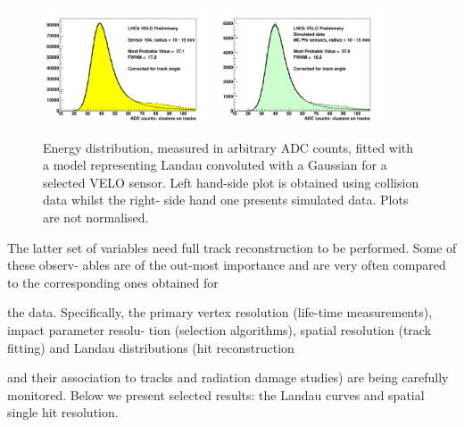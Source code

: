 \begin{figure}[]
    \centering
    \includegraphics[width=0.45\textwidth]{figures/SensorSimulation/adc_data.pdf}
    \includegraphics[width=0.45\textwidth]{figures/SensorSimulation/adc_mc.pdf}
    \caption{
Energy distribution, measured in arbitrary ADC counts, fitted with a model representing Landau convoluted
with a Gaussian for a selected VELO sensor. Left hand-side plot is obtained using collision data whilst the right-
side hand one presents simulated data. Plots are not normalised.
}
    \label{fig:adc}
\end{figure}

The latter set of variables need full track reconstruction to be performed. Some of these observ-
ables are of the out-most importance and are very often compared to the corresponding ones obtained for

the data. Specifically, the primary vertex resolution (life-time measurements), impact parameter resolu-
tion (selection algorithms), spatial resolution (track fitting) and Landau distributions (hit reconstruction

and their association to tracks and radiation damage studies) are being carefully monitored. Below we
present selected results: the Landau curves and spatial single hit resolution.

